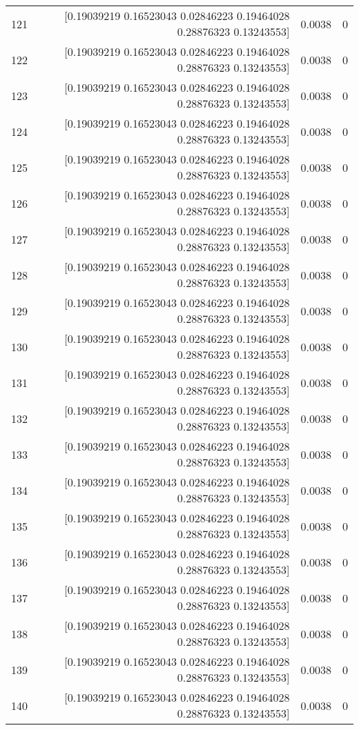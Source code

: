 \begin{longtable}{lrrr}
121 & [0.19039219 0.16523043 0.02846223 0.19464028 0.28876323 0.13243553] & 0.0038 & 0 \\
122 & [0.19039219 0.16523043 0.02846223 0.19464028 0.28876323 0.13243553] & 0.0038 & 0 \\
123 & [0.19039219 0.16523043 0.02846223 0.19464028 0.28876323 0.13243553] & 0.0038 & 0 \\
124 & [0.19039219 0.16523043 0.02846223 0.19464028 0.28876323 0.13243553] & 0.0038 & 0 \\
125 & [0.19039219 0.16523043 0.02846223 0.19464028 0.28876323 0.13243553] & 0.0038 & 0 \\
126 & [0.19039219 0.16523043 0.02846223 0.19464028 0.28876323 0.13243553] & 0.0038 & 0 \\
127 & [0.19039219 0.16523043 0.02846223 0.19464028 0.28876323 0.13243553] & 0.0038 & 0 \\
128 & [0.19039219 0.16523043 0.02846223 0.19464028 0.28876323 0.13243553] & 0.0038 & 0 \\
129 & [0.19039219 0.16523043 0.02846223 0.19464028 0.28876323 0.13243553] & 0.0038 & 0 \\
130 & [0.19039219 0.16523043 0.02846223 0.19464028 0.28876323 0.13243553] & 0.0038 & 0 \\
131 & [0.19039219 0.16523043 0.02846223 0.19464028 0.28876323 0.13243553] & 0.0038 & 0 \\
132 & [0.19039219 0.16523043 0.02846223 0.19464028 0.28876323 0.13243553] & 0.0038 & 0 \\
133 & [0.19039219 0.16523043 0.02846223 0.19464028 0.28876323 0.13243553] & 0.0038 & 0 \\
134 & [0.19039219 0.16523043 0.02846223 0.19464028 0.28876323 0.13243553] & 0.0038 & 0 \\
135 & [0.19039219 0.16523043 0.02846223 0.19464028 0.28876323 0.13243553] & 0.0038 & 0 \\
136 & [0.19039219 0.16523043 0.02846223 0.19464028 0.28876323 0.13243553] & 0.0038 & 0 \\
137 & [0.19039219 0.16523043 0.02846223 0.19464028 0.28876323 0.13243553] & 0.0038 & 0 \\
138 & [0.19039219 0.16523043 0.02846223 0.19464028 0.28876323 0.13243553] & 0.0038 & 0 \\
139 & [0.19039219 0.16523043 0.02846223 0.19464028 0.28876323 0.13243553] & 0.0038 & 0 \\
140 & [0.19039219 0.16523043 0.02846223 0.19464028 0.28876323 0.13243553] & 0.0038 & 0 \\

\end{longtable}
